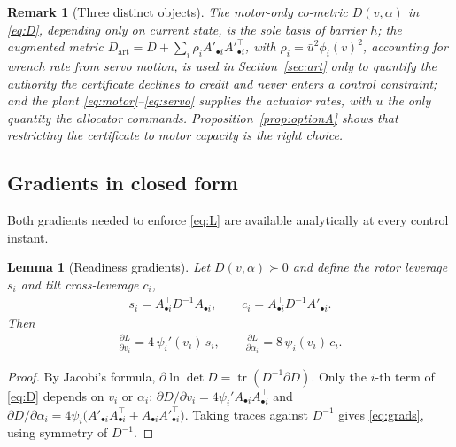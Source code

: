 \documentclass[letter, 10 pt, journal, twoside]{IEEEtran}
\theoremstyle{compact}
\newtheorem{lemma}[theorem]{Lemma}
\newtheorem{remark}[theorem]{Remark}
\begin{document}
\begin{remark}[Three distinct objects]\label{rem:threeobjects}
The motor-only co-metric $D(v,\alpha)$ in \eqref{eq:D}, depending only on current state, is the \emph{sole} basis of barrier $h$; the augmented metric $D_{\mathrm{art}} = D + \sum_i \rho_i A'_{\bullet i}A'^{\top}_{\bullet i}$, with $\rho_i=\bar u^2\phi_i(v)^2$, accounting for wrench rate from servo motion, is used in Section~\ref{sec:art} only to quantify the authority the certificate declines to credit and never enters a control constraint; and the plant \eqref{eq:motor}--\eqref{eq:servo} supplies the actuator rates, with $u$ the only quantity the allocator commands. Proposition~\ref{prop:optionA} shows that restricting the certificate to motor capacity is the right choice.
\end{remark}



\subsection{Gradients in closed form}
\label{sec:grads}

Both gradients needed to enforce \eqref{eq:L} are available analytically at every control instant.
 
\begin{lemma}[Readiness gradients]\label{lem:gradients}
Let $D(v,\alpha)\succ0$ and define the \emph{rotor leverage} $s_i$ and \emph{tilt cross-leverage} $c_i$,
%
\begin{align}
    s_i = A_{\bullet i}^{\!\top}D^{-1}A_{\bullet i},
    \qquad
    c_i = A_{\bullet i}^{\!\top}D^{-1}A'_{\bullet i}.
    \label{eq:leverage}
\end{align}
%
Then
%
\begin{align}
    \frac{\partial L}{\partial v_i} = 4\,\psi_i'(v_i)\,s_i,
    \qquad
    \frac{\partial L}{\partial \alpha_i} = 8\,\psi_i(v_i)\,c_i .
    \label{eq:grads}
\end{align}
\end{lemma}
\begin{proof}
By Jacobi's formula, $\partial\ln\det D=\operatorname{tr}(D^{-1}\partial D)$. Only the $i$-th term of \eqref{eq:D} depends on $v_i$ or $\alpha_i$: $\partial D/\partial v_i = 4\psi_i' A_{\bullet i}A_{\bullet i}^{\!\top}$ and $\partial D/\partial \alpha_i = 4\psi_i\big(A'_{\bullet i}A_{\bullet i}^{\!\top} + A_{\bullet i}A'^{\top}_{\bullet i}\big)$. Taking traces against $D^{-1}$ gives \eqref{eq:grads}, using symmetry of $D^{-1}$. 
\end{proof}
\end{document}
